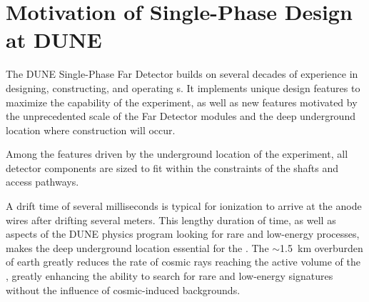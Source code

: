 \section{Motivation of Single-Phase \lartpc Design at DUNE}
\label{sec:fdsp-design-impl}

The DUNE Single-Phase Far Detector builds on several decades of experience in designing, constructing, and operating \lartpc{}s.  It implements unique design features to maximize the capability of the experiment, as well as new features motivated by the unprecedented scale of the Far Detector modules and the deep underground location where construction will occur.

Among the features driven by the underground location of the experiment, all detector components are sized to fit within the constraints of the \surf shafts and access pathways.

A drift time of several milliseconds is typical for ionization to arrive at the anode wires after drifting several meters.  This lengthy duration of time, as well as aspects of the DUNE physics program looking for rare and low-energy processes, makes the deep underground location essential for the .  The  $\sim$\SI{1.5}{km} overburden of earth greatly reduces the rate of cosmic rays reaching the active volume of the , greatly enhancing the ability to search for rare and low-energy signatures without the influence of cosmic-induced backgrounds.  








